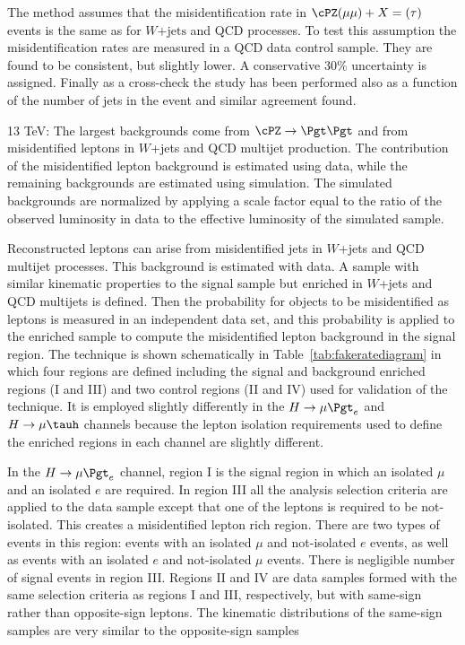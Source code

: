 The method assumes that the misidentification rate in $\cPZ(\mu \mu) +X=(\tau)$ events is the same as
for $W\mathrm{+jets}$ and QCD processes. To test this assumption the misidentification rates are measured in a QCD data control
sample. They are found to be consistent, but slightly lower. A conservative 30\% uncertainty is assigned.
Finally as a cross-check the study has been performed also as a function of the number of jets in the event and similar agreement found.


13 TeV:
The largest backgrounds come from $\cPZ \rightarrow \Pgt \Pgt$ and from misidentified leptons in $W$+jets and QCD multijet production. The contribution of the misidentified lepton background is estimated using data, while the remaining backgrounds are estimated using simulation.
The simulated backgrounds are normalized by applying a scale factor equal to the ratio of the observed luminosity in data to the effective luminosity of the simulated sample.


Reconstructed leptons can arise from misidentified jets in $W$+jets and QCD multijet processes.
This background is estimated with data. A sample with similar kinematic
properties to the signal sample but enriched in $W$+jets and QCD multijets
is defined. Then the probability for objects to be misidentified as leptons is measured
in an independent data set, and this probability is applied to the enriched sample to
compute the misidentified lepton background in the signal region.
The technique is shown schematically in Table~\ref{tab:fakeratediagram} in which four regions
are defined including the signal and background enriched regions (I and III) and two control regions (II and IV) used for validation
of the technique. It is employed slightly differently in the
$H \rightarrow \mu \Pgt_{e}$ and $H \rightarrow \mu \tauh$ channels because
the lepton isolation requirements used to define the enriched regions in each channel
are slightly different.

In the $H \rightarrow \mu \Pgt_{e}$ channel, region I is the signal region in which an isolated $\mu$ and an isolated $e$ are required.
In region III all the analysis selection criteria are applied to the data sample except that
one of the leptons is required to be not-isolated. This creates a misidentified lepton rich region. There are two types of events in this region: events with an
isolated $\mu$ and not-isolated $e$ events, as well as events with an isolated $e$ and not-isolated $\mu$ events. There is negligible number of signal events in region III. Regions II and IV are data samples formed with the same selection criteria as regions I and III, respectively, but with same-sign rather than opposite-sign leptons. The kinematic distributions of the same-sign samples are very similar to the opposite-sign samples

